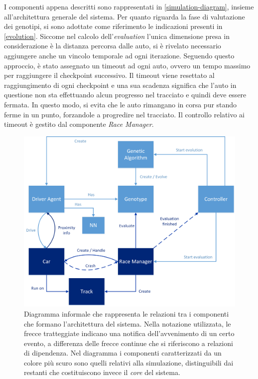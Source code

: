 \documentclass[a4paper,12pt]{article}
\begin{document}
I componenti appena descritti sono rappresentati in \autoref{simulation-diagram}, insieme all'architettura generale del sistema. Per quanto riguarda la fase di valutazione dei genotipi, si sono adottate come riferimento le indicazioni presenti in \autoref{evolution}. Siccome nel calcolo dell'\emph{evaluation} l'unica dimensione presa in considerazione è la distanza percorsa dalle auto, si è rivelato necessario aggiungere anche un vincolo temporale ad ogni iterazione. Seguendo questo approccio, è stato assegnato un timeout ad ogni auto, ovvero un tempo massimo per raggiungere il checkpoint successivo. Il timeout viene resettato al raggiungimento di ogni checkpoint e una sua scadenza significa che l'auto in questione non sta effettuando alcun progresso nel tracciato e quindi deve essere fermata. In questo modo, si evita che le auto rimangano in corsa pur stando ferme in un punto, forzandole a progredire nel tracciato. Il controllo relativo ai timeout è gestito dal componente \emph{Race Manager}.

\begin{figure}[H]
	\centering
	\includegraphics[width=130mm]{./img/architecture-simulation.png}
	\caption{Diagramma informale che rappresenta le relazioni tra i componenti che formano l'architettura del sistema. Nella notazione utilizzata, le frecce tratteggiate indicano una notifica dell'avvenimento di un certo evento, a differenza delle frecce continue che si riferiscono a relazioni di dipendenza. Nel diagramma i componenti caratterizzati da un colore più scuro sono quelli relativi alla simulazione, distinguibili dai restanti che costituiscono invece il \emph{core} del sistema.  \label{simulation-diagram}}
\end{figure}
\end{document}
